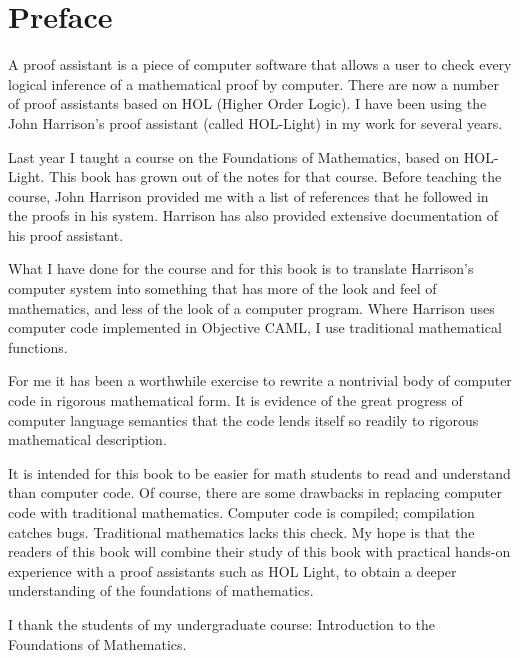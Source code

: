 

   \newpage

   \setcounter{chapter}{-1}
   \chapter{Preface}
   \label{XX}  %

  A proof assistant is a piece of computer software that allows a user to check every logical inference of a mathematical proof by computer.  There are now a number of proof assistants based on HOL (Higher Order Logic).  I have been using the John Harrison's proof assistant (called HOL-Light) in my work for several years.

  Last year I taught a course on the Foundations of Mathematics, based on HOL-Light.  This book has grown out of the notes for that course.  Before teaching the course, John Harrison provided me with a list of references that he followed in the proofs in his system.  Harrison has also provided extensive documentation of his proof assistant.  

What I have done for the course and for this book is to translate Harrison's computer system into something that has more of the look and feel of mathematics, and less of the look of a computer program.  Where Harrison uses computer code implemented in Objective CAML, I use traditional mathematical functions.  

For me it has been a worthwhile exercise to rewrite a nontrivial body of computer code in rigorous mathematical form.  It is evidence of the great progress of computer language semantics that the code lends itself so readily to rigorous mathematical description.

It is intended for this book to be easier for math students to read and understand than computer code.  Of course, there are some drawbacks in replacing computer code with traditional mathematics.  Computer code is compiled; compilation catches bugs.  Traditional mathematics lacks this check.   My hope is that the readers of this book will combine their study of this book with practical hands-on experience with a proof assistants such as HOL Light, to obtain a deeper understanding of the foundations of mathematics.

   I thank the students of my undergraduate course: Introduction to the Foundations of Mathematics.






